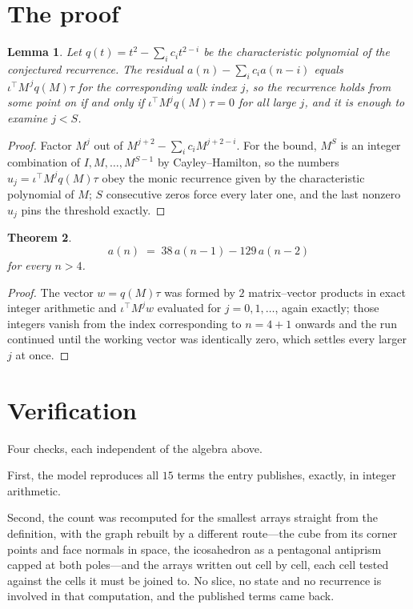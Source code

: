 \documentclass[11pt,a4paper]{article}
\theoremstyle{plain}
\newtheorem{theorem}{Theorem}
\newtheorem{lemma}[theorem]{Lemma}
\theoremstyle{definition}
\begin{document}
\section{The proof}

\begin{lemma}\label{lem:crit}
Let $q(t)=t^{2}-\sum_i c_it^{2-i}$ be the characteristic polynomial of the
conjectured recurrence. The residual $a(n)-\sum_ic_ia(n-i)$ equals
$\iota^{\!\top}M^{\,j}q(M)\tau$ for the corresponding walk index $j$, so the recurrence
holds from some point on if and only if $\iota^{\!\top}M^{j}q(M)\tau=0$ for all large $j$,
and it is enough to examine $j<S$.
\end{lemma}

\begin{proof}
Factor $M^{j}$ out of $M^{j+2}-\sum_ic_iM^{j+2-i}$. For the bound, $M^{S}$
is an integer combination of $I,M,\dots,M^{S-1}$ by Cayley--Hamilton, so the numbers
$u_j=\iota^{\!\top}M^{j}q(M)\tau$ obey the monic recurrence given by the characteristic
polynomial of $M$; $S$ consecutive zeros force every later one, and the last nonzero $u_j$
pins the threshold exactly.
\end{proof}

\begin{theorem}
\[
a(n)\;=\;38\,a(n-1) - 129\,a(n-2)
\]
for every $n>4$.
\end{theorem}

\begin{proof}
The vector $w=q(M)\tau$ was formed by $2$ matrix--vector products in exact integer
arithmetic and $\iota^{\!\top}M^{j}w$ evaluated for $j=0,1,\dots$, again exactly; those
integers vanish from the index corresponding to $n=4+1$ onwards and the run continued
until the working vector was identically zero, which settles every larger $j$ at once.
\end{proof}

\section{Verification}

Four checks, each independent of the algebra above.

First, the model reproduces all $15$ terms the entry publishes, exactly, in integer
arithmetic.

Second, the count was recomputed for the smallest arrays straight from the definition, with the
graph rebuilt by a different route---the cube from its corner points and face normals in space,
the icosahedron as a pentagonal antiprism capped at both poles---and the arrays written out cell
by cell, each cell tested against the cells it must be joined to. No slice, no state and no
recurrence is involved in that computation, and the published terms came back.
\end{document}
